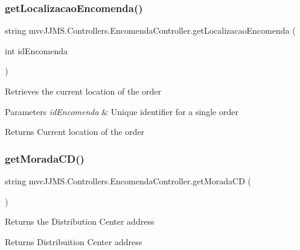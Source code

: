 \subsubsection{\texorpdfstring{get\+Localizacao\+Encomenda()}{getLocalizacaoEncomenda()}}
{\footnotesize\ttfamily string mvc\+J\+J\+M\+S.\+Controllers.\+Encomenda\+Controller.\+get\+Localizacao\+Encomenda (\begin{DoxyParamCaption}\item[{int}]{id\+Encomenda }\end{DoxyParamCaption})\hspace{0.3cm}{\ttfamily [inline]}}



Retrieves the current location of the order 


\begin{DoxyParams}{Parameters}
{\em id\+Encomenda} & Unique identifier for a single order\\
\hline
\end{DoxyParams}
\begin{DoxyReturn}{Returns}
Current location of the order
\end{DoxyReturn}
\mbox{\label{classmvc_j_j_m_s_1_1_controllers_1_1_encomenda_controller_a2754bcfc4246dcc86737356fb5ff925a}} 
\subsubsection{\texorpdfstring{get\+Morada\+C\+D()}{getMoradaCD()}}
{\footnotesize\ttfamily string mvc\+J\+J\+M\+S.\+Controllers.\+Encomenda\+Controller.\+get\+Morada\+CD (\begin{DoxyParamCaption}{ }\end{DoxyParamCaption})\hspace{0.3cm}{\ttfamily [inline]}}



Returns the Distribution Center address 

\begin{DoxyReturn}{Returns}
Distribuition Center address
\end{DoxyReturn}
\mbox{\label{classmvc_j_j_m_s_1_1_controllers_1_1_encomenda_controller_a88efec95120dea4ca5b3ad0e6add6abe}} 

